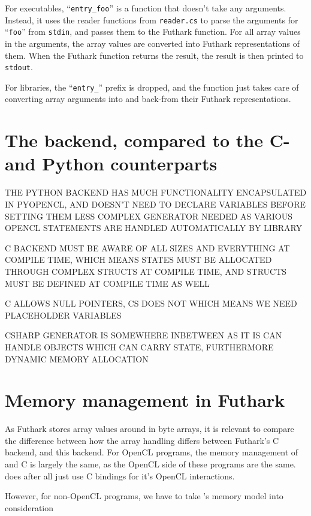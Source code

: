 For executables, ``\texttt{entry\_foo}'' is a function that doesn't take any
arguments. Instead, it uses the reader functions from \texttt{reader.cs} to parse the
arguments for ``\texttt{foo}'' from \texttt{stdin}, and passes them to the
Futhark function. For all array values in the arguments, the array values are
converted into Futhark representations of them.
When the Futhark function returns the result, the result is then printed to \texttt{stdout}.

For libraries, the ``\texttt{entry\_}'' prefix is dropped, and the function
just takes care of converting array arguments into and back-from their Futhark
representations.

\clearpage

\section{The \csharp{} backend, compared to the C- and Python counterparts}

THE PYTHON BACKEND HAS MUCH FUNCTIONALITY ENCAPSULATED IN PYOPENCL, AND DOESN'T
NEED TO DECLARE VARIABLES BEFORE SETTING THEM
LESS COMPLEX GENERATOR NEEDED AS VARIOUS OPENCL STATEMENTS ARE HANDLED
AUTOMATICALLY BY LIBRARY

C BACKEND MUST BE AWARE OF ALL SIZES AND EVERYTHING AT COMPILE TIME, WHICH MEANS
STATES MUST BE ALLOCATED THROUGH COMPLEX STRUCTS AT COMPILE TIME, AND STRUCTS
MUST BE DEFINED AT COMPILE TIME AS WELL

C ALLOWS NULL POINTERS, CS DOES NOT WHICH MEANS WE NEED PLACEHOLDER VARIABLES

CSHARP GENERATOR IS SOMEWHERE INBETWEEN AS IT IS CAN HANDLE OBJECTS WHICH CAN
CARRY STATE, FURTHERMORE DYNAMIC MEMORY ALLOCATION

\section{Memory management in Futhark \csharp{}}
As Futhark stores array values around in byte arrays, it is relevant to compare
the difference between how the array handling differs between Futhark's C
backend, and this \csharp{} backend.
For OpenCL programs, the memory management of \csharp{} and C is largely the
same, as the OpenCL side of these programs are the same. \csharp{} does after
all just use C bindings for it's OpenCL interactions.

However, for non-OpenCL \csharp{} programs, we have to take \csharp{}'s memory
model into consideration

